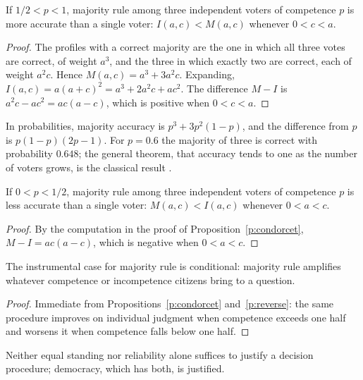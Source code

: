 \documentclass{situationist-preprint}
\begin{document}
\begin{proposition}\label{p:condorcet}
If $1/2 < p < 1$, majority rule among three independent voters of competence $p$ is more accurate than a single voter: $I(a,c) < M(a,c)$ whenever $0 < c < a$.
\end{proposition}

\begin{proof}
The profiles with a correct majority are the one in which all three votes are correct, of weight $a^3$, and the three in which exactly two are correct, each of weight $a^2c$. Hence $M(a,c) = a^3 + 3a^2c$. Expanding, $I(a,c) = a(a+c)^2 = a^3 + 2a^2c + ac^2$. The difference $M - I$ is $a^2c - ac^2 = ac(a-c)$, which is positive when $0 < c < a$.
\end{proof}

In probabilities, majority accuracy is $p^3 + 3p^2(1-p)$, and the difference from $p$ is $p(1-p)(2p-1)$. For $p = 0.6$ the majority of three is correct with probability $0.648$; the general theorem, that accuracy tends to one as the number of voters grows, is the classical result \citep{Condorcet1785,Grofman1983}.

\begin{proposition}\label{p:reverse}
If $0 < p < 1/2$, majority rule among three independent voters of competence $p$ is less accurate than a single voter: $M(a,c) < I(a,c)$ whenever $0 < a < c$.
\end{proposition}

\begin{proof}
By the computation in the proof of Proposition~\ref{p:condorcet}, $M - I = ac(a-c)$, which is negative when $0 < a < c$.
\end{proof}

\begin{corollary}\label{c:conditional}
The instrumental case for majority rule is conditional: majority rule amplifies whatever competence or incompetence citizens bring to a question.
\end{corollary}

\begin{proof}
Immediate from Propositions~\ref{p:condorcet} and~\ref{p:reverse}: the same procedure improves on individual judgment when competence exceeds one half and worsens it when competence falls below one half.
\end{proof}

\begin{theorem}\label{t:main}
Neither equal standing nor reliability alone suffices to justify a decision procedure; democracy, which has both, is justified.
\end{theorem}
\end{document}
